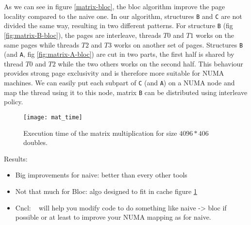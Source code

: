 As we can see in figure \ref{matrix-bloc}, the bloc algorithm improve the page
locality compared to the naive one. In our algorithm, structures
\texttt{B} and \texttt{C} are not divided the same way, resulting in two
different patterns. For structure \texttt{B} (fig \ref{fig:matrix-B-bloc}),
the pages are interleave, threads $T0$ and $T1$ works on the same pages while
threads $T2$ and $T3$ works on another set of pages. Structures \texttt{B} (and
\texttt{A}, fig \ref{fig:matrix-A-bloc}) are cut in two parts, the first half
is shared by thread $T0$ and $T2$ while the two others works on the second
half. This behaviour provides strong page exclusivity and is therefore more
suitable for NUMA machines. We can easily put each subpart of \texttt{C} (and
\texttt{A}) on a NUMA node and map the thread using it to this node, matrix
\texttt{B} can be distributed using interleave policy.


\begin{figure}[htb]
    \centering
    \texttt{[image: mat\_time]}
    \caption{Execution time of the matrix multiplication for size $4096*406$ doubles.}
    \label{fig:matrix-res}
\end{figure}

Results:
\begin{itemize}
    \item Big improvements for naive: better than every other tools
    \item Not that much for Bloc: algo designed to fit in cache figure
        \ref{fig:matrix-res}
    \item Cncl: \TABARNAC~ will help you modify code to do something like naive
        -> bloc if possible or at least to improve your NUMA mapping as for
        naive.
\end{itemize}


